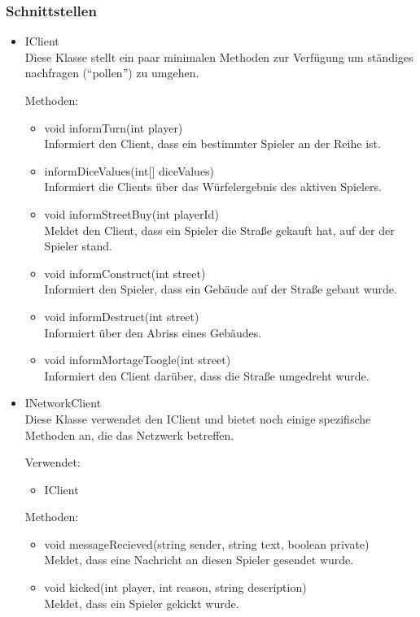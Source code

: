 \documentclass[a4paper,10pt]{article}
\begin{document}
\subsubsection{Schnittstellen}
\begin{itemize}
\item IClient\\
Diese Klasse stellt ein paar minimalen Methoden zur Verfügung um ständiges nachfragen ("`pollen"') zu umgehen.

Methoden:
\begin{itemize}
\item void informTurn(int player) \\
Informiert den Client, dass ein bestimmter Spieler an der Reihe ist.
\item informDiceValues(int[] diceValues) \\
Informiert die Clients über das Würfelergebnis des aktiven Spielers.
\item void informStreetBuy(int playerId) \\
Meldet den Client, dass ein Spieler die Straße gekauft hat, auf der der Spieler stand.
\item void informConstruct(int street) \\
Informiert den Spieler, dass ein Gebäude auf der Straße gebaut wurde.
\item void informDestruct(int street) \\
Informiert über den Abriss eines Gebäudes.
\item void informMortageToogle(int street) \\
Informiert den Client darüber, dass die Straße umgedreht wurde.
\end{itemize}
\item INetworkClient \\
Diese Klasse verwendet den IClient und bietet noch einige spezifische Methoden an, die das Netzwerk betreffen.

Verwendet:
\begin{itemize}
\item IClient
\end{itemize}

Methoden:
\begin{itemize}
\item void messageRecieved(string sender, string text, boolean private) \\
Meldet, dass eine Nachricht an diesen Spieler gesendet wurde.
\item void kicked(int player, int reason, string description) \\
Meldet, dass ein Spieler gekickt wurde.
\end{itemize}
\end{itemize} %
\end{document}
